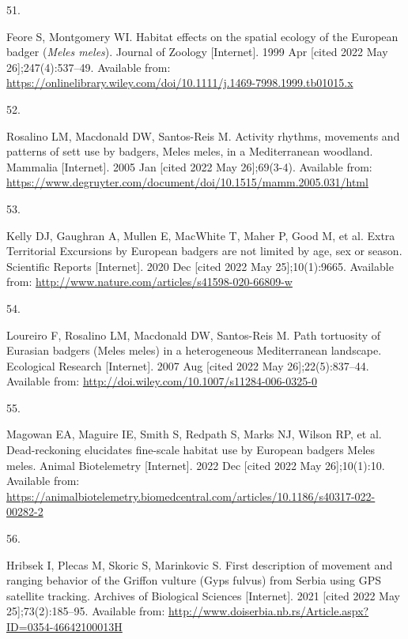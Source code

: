 \documentclass[10pt,a4paper]{article}
\newlength{\cslhangindent}
\newlength{\csllabelwidth}
\newlength{\cslentryspacingunit} %
\newenvironment{CSLReferences}[2] %
 {%
  \setlength{\parindent}{0pt}
  \ifodd #1
  \let\oldpar\par
  \def\par{\hangindent=\cslhangindent\oldpar}
  \fi
  \setlength{\parskip}{#2\cslentryspacingunit}
 }%
 {}
\newcommand{\CSLLeftMargin}[1]{\parbox[t]{\csllabelwidth}{#1}}
\newcommand{\CSLRightInline}[1]{\parbox[t]{\linewidth - \csllabelwidth}{#1}\break}
\begin{document}
\begin{CSLReferences}{0}{0}
\leavevmode{}%
\CSLLeftMargin{51. }
\CSLRightInline{Feore S, Montgomery WI. Habitat effects on the spatial ecology of the {European} badger (\emph{{Meles} meles}). Journal of Zoology {[}Internet{]}. 1999 Apr {[}cited 2022 May 26{]};247(4):537--49. Available from: \url{https://onlinelibrary.wiley.com/doi/10.1111/j.1469-7998.1999.tb01015.x}}

\leavevmode{}%
\CSLLeftMargin{52. }
\CSLRightInline{Rosalino LM, Macdonald DW, Santos-Reis M. Activity rhythms, movements and patterns of sett use by badgers, {Meles} meles, in a {Mediterranean} woodland. Mammalia {[}Internet{]}. 2005 Jan {[}cited 2022 May 26{]};69(3-4). Available from: \url{https://www.degruyter.com/document/doi/10.1515/mamm.2005.031/html}}

\leavevmode{}%
\CSLLeftMargin{53. }
\CSLRightInline{Kelly DJ, Gaughran A, Mullen E, MacWhite T, Maher P, Good M, et al. Extra {Territorial} {Excursions} by {European} badgers are not limited by age, sex or season. Scientific Reports {[}Internet{]}. 2020 Dec {[}cited 2022 May 25{]};10(1):9665. Available from: \url{http://www.nature.com/articles/s41598-020-66809-w}}

\leavevmode{}%
\CSLLeftMargin{54. }
\CSLRightInline{Loureiro F, Rosalino LM, Macdonald DW, Santos-Reis M. Path tortuosity of {Eurasian} badgers ({Meles} meles) in a heterogeneous {Mediterranean} landscape. Ecological Research {[}Internet{]}. 2007 Aug {[}cited 2022 May 26{]};22(5):837--44. Available from: \url{http://doi.wiley.com/10.1007/s11284-006-0325-0}}

\leavevmode{}%
\CSLLeftMargin{55. }
\CSLRightInline{Magowan EA, Maguire IE, Smith S, Redpath S, Marks NJ, Wilson RP, et al. Dead-reckoning elucidates fine-scale habitat use by {European} badgers {Meles} meles. Animal Biotelemetry {[}Internet{]}. 2022 Dec {[}cited 2022 May 26{]};10(1):10. Available from: \url{https://animalbiotelemetry.biomedcentral.com/articles/10.1186/s40317-022-00282-2}}

\leavevmode{}%
\CSLLeftMargin{56. }
\CSLRightInline{Hribsek I, Plecas M, Skoric S, Marinkovic S. First description of movement and ranging behavior of the {Griffon} vulture ({Gyps} fulvus) from {Serbia} using {GPS} satellite tracking. Archives of Biological Sciences {[}Internet{]}. 2021 {[}cited 2022 May 25{]};73(2):185--95. Available from: \url{http://www.doiserbia.nb.rs/Article.aspx?ID=0354-46642100013H}}


\end{CSLReferences}
\end{document}
